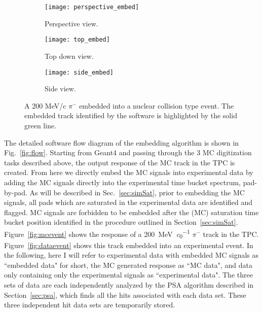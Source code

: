 \begin{figure}[!htb]
    \centering
    \begin{subfigure}[t]{0.49\textwidth}
        \centering
        \texttt{[image: perspective\_embed]}
        \caption{Perspective view.} \label{fig:persEmbed}
    \end{subfigure}
    \hfill
    \begin{subfigure}[t]{.3\textwidth}
        \centering
        \texttt{[image: top\_embed]} 
        \caption{Top down view.} \label{fig:topEmbed}
    \end{subfigure}
     \hfill
    \begin{subfigure}[t]{\textwidth}
        \centering
        \texttt{[image: side\_embed]} 
        \caption{Side view.} \label{fig:sideEmbed}
    \end{subfigure}
    \caption{A 200 MeV/c $\pi^-$ embedded into a nuclear collision type event. The embedded track identified by the software is highlighted by the solid green line. }

\label{fig:embedtrack}
\end{figure}


The detailed software flow diagram of the embedding algorithm is shown in Fig.~\ref{fig:flow}. Starting from Geant4 and passing through the 3 MC digitization tasks described above, the output response of the MC track in the TPC is created. From here we directly embed the MC signals into experimental data by adding the MC signals directly into the experimental time bucket spectrum, pad-by-pad. As will be described in Sec.~\ref{sec:simSat}, prior to embedding the MC signals, all pads which are saturated in the experimental data are identified and flagged. MC signals are forbidden to be embedded after the (MC) saturation time bucket position identified in the procedure outlined in Section~\ref{sec:simSat}. Figure~\ref{fig:mcevent} shows the response of a \SI{200}{\mega\electronvolt\per\clight} $\pi^-$ track in the TPC. Figure~\ref{fig:dataevent} shows this track embedded into an experimental event. In the following, here I will refer to experimental data with embedded MC signals as ``embedded data" for short, the MC generated response as ``MC data", and data only containing only the experimental signals as ``experimental data". The three sets of data are each independently analyzed by the PSA algorithm described in Section~\ref{sec:psa},  which finds all the hits associated with each data set. These three independent hit data sets are temporarily stored. 

